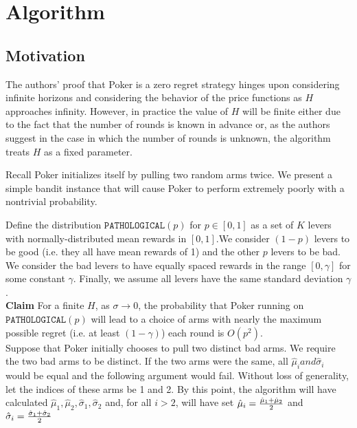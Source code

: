 \documentclass[12pt]{article}
\begin{document}
\section{Algorithm}

\subsection{Motivation}

The authors' proof that Poker is a zero regret strategy hinges upon considering infinite horizons and considering the behavior of the price functions as $H$ approaches infinity. However, in practice the value of $H$ will be finite either due to the fact that the number of rounds is known in advance or, as the authors suggest in the case in which the number of rounds is unknown, the algorithm treats $H$ as a fixed parameter.

Recall Poker initializes itself by pulling two random arms twice. We present a simple bandit instance that will cause Poker to perform extremely poorly with a nontrivial probability.

Define the distribution $\texttt{PATHOLOGICAL}(p)$ for $p \in [0,1]$ as a set of $K$ levers with normally-distributed mean rewards in $[0,1]$.We consider $(1-p)$ levers to be good (i.e. they all have mean rewards of 1) and the other $p$ levers to be bad. We consider the bad levers to have equally spaced rewards in the range $[0,\gamma]$ for some constant $\gamma$. Finally, we assume all levers have the same standard deviation $\gamma$. \\

\noindent
\textbf{Claim} For a finite $H$, as $\sigma \rightarrow 0$, the probability that Poker running on $\texttt{PATHOLOGICAL}(p)$ will lead to a choice of arms with nearly the maximum possible regret (i.e. at least $(1-\gamma)$) each round is $O(p^{2})$. \\ 

Suppose that Poker initially chooses to pull two distinct bad arms. We require the two bad arms to be distinct. If the two arms were the same, all $\hat{\mu}_{i} and \hat{\sigma}_{i}$ would be equal and the following argument would fail. Without loss of generality, let the indices of these arms be 1 and 2. By this point, the algorithm will have calculated $\hat{\mu}_{1}, \hat{\mu}_{2}, \hat{\sigma}_{1},\hat{\sigma}_{2}$ and, for all $i > 2$, will have set $\hat{\mu}_{i}= {\hat{\mu}_{1}+\hat{\mu}_{2}\over 2}$ and $\hat{\sigma}_{i} = {\hat{\sigma}_{1}+\hat{\sigma}_{2}\over 2}$
\end{document}
